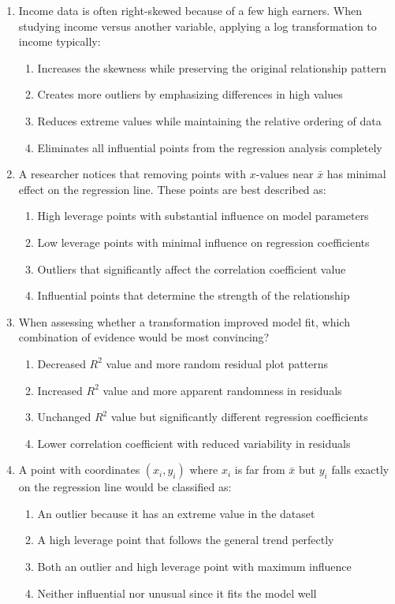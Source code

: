 \documentclass[11pt]{article}
\begin{document}
\begin{enumerate}
\item Income data is often right-skewed because of a few high earners. When studying income versus another variable, applying a log transformation to income typically:
\begin{enumerate}[label=(\Alph*)]
\item Increases the skewness while preserving the original relationship pattern
\item Creates more outliers by emphasizing differences in high values
\item Reduces extreme values while maintaining the relative ordering of data
\item Eliminates all influential points from the regression analysis completely
\end{enumerate}

\item A researcher notices that removing points with $x$-values near $\bar{x}$ has minimal effect on the regression line. These points are best described as:
\begin{enumerate}[label=(\Alph*)]
\item High leverage points with substantial influence on model parameters
\item Low leverage points with minimal influence on regression coefficients  
\item Outliers that significantly affect the correlation coefficient value
\item Influential points that determine the strength of the relationship
\end{enumerate}

\item When assessing whether a transformation improved model fit, which combination of evidence would be most convincing?
\begin{enumerate}[label=(\Alph*)]
\item Decreased $R^2$ value and more random residual plot patterns
\item Increased $R^2$ value and more apparent randomness in residuals
\item Unchanged $R^2$ value but significantly different regression coefficients
\item Lower correlation coefficient with reduced variability in residuals
\end{enumerate}

\item A point with coordinates $(x_i, y_i)$ where $x_i$ is far from $\bar{x}$ but $y_i$ falls exactly on the regression line would be classified as:
\begin{enumerate}[label=(\Alph*)]
\item An outlier because it has an extreme value in the dataset
\item A high leverage point that follows the general trend perfectly
\item Both an outlier and high leverage point with maximum influence
\item Neither influential nor unusual since it fits the model well
\end{enumerate}


\end{enumerate}
\end{document}
